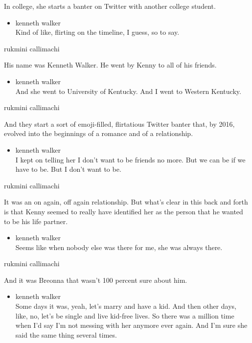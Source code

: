 In college, she starts a banter on Twitter with another college student.

\begin{itemize}
\tightlist
\item
  kenneth walker\\
  Kind of like, flirting on the timeline, I guess, so to say.
\end{itemize}

rukmini callimachi

His name was Kenneth Walker. He went by Kenny to all of his friends.

\begin{itemize}
\tightlist
\item
  kenneth walker\\
  And she went to University of Kentucky. And I went to Western
  Kentucky.
\end{itemize}

rukmini callimachi

And they start a sort of emoji-filled, flirtatious Twitter banter that,
by 2016, evolved into the beginnings of a romance and of a relationship.

\begin{itemize}
\tightlist
\item
  kenneth walker\\
  I kept on telling her I don't want to be friends no more. But we can
  be if we have to be. But I don't want to be.
\end{itemize}

rukmini callimachi

It was an on again, off again relationship. But what's clear in this
back and forth is that Kenny seemed to really have identified her as the
person that he wanted to be his life partner.

\begin{itemize}
\tightlist
\item
  kenneth walker\\
  Seems like when nobody else was there for me, she was always there.
\end{itemize}

rukmini callimachi

And it was Breonna that wasn't 100 percent sure about him.

\begin{itemize}
\tightlist
\item
  kenneth walker\\
  Some days it was, yeah, let's marry and have a kid. And then other
  days, like, no, let's be single and live kid-free lives. So there was
  a million time when I'd say I'm not messing with her anymore ever
  again. And I'm sure she said the same thing several times.
\end{itemize}


